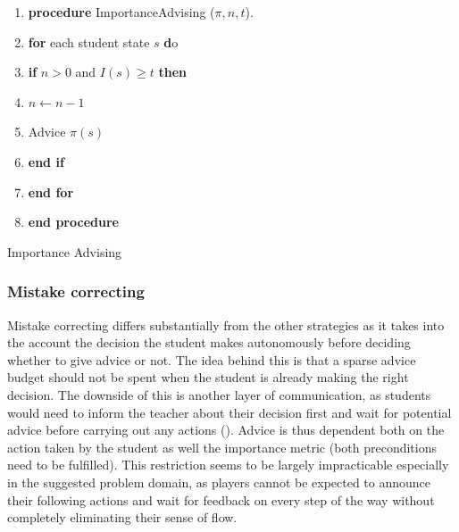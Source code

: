 \documentclass[12pt,twoside]{article}
\theoremstyle{plain}
\theoremstyle{definition}
\theoremstyle{remark}
\begin{document}
\begin{algorithm}[H]
  \scriptsize
  \begin{enumerate}
	\item \textbf{procedure} ImportanceAdvising ($\pi, n, t$). 
	\item \qquad \textbf{for} each student state $s$ \textbf do
	\item \qquad \qquad \textbf{if} $n > 0$ and $I(s) \geq t $ \textbf{then}
	\item \qquad \qquad \qquad $n \leftarrow n - 1$
	\item \qquad \qquad \qquad Advice $\pi(s)$
	\item \qquad \qquad \textbf{end if}
	\item \qquad \textbf{end for}
	\item \textbf{end procedure}
\end{enumerate}
  	\caption{Importance Advising}
\end{algorithm}



\subsubsection{Mistake correcting}

Mistake correcting differs substantially from the other strategies as it takes into the account the decision the student makes autonomously before deciding whether to give advice or not. The idea behind this is that a sparse advice budget should not be spent when the student is already making the right decision. The downside of this is another layer of communication, as students would need to inform the teacher about their decision first and wait for potential advice before carrying out any actions (\cite{Taylor2014reinforcement}). Advice is thus dependent both on the action taken by the student as well the importance metric (both preconditions need to be fulfilled).
This restriction seems to be largely impracticable especially in the suggested problem domain, as players cannot be expected to announce their following actions and wait for feedback on every step of the way without completely eliminating their sense of flow.
\end{document}
